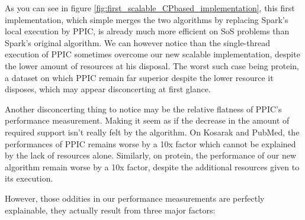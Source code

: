 \documentclass{eplmastersthesis}
\begin{document}
As you can see in figure \ref{fig:first_scalable_CPbased_implementation}, this first implementation, which simple merges the two algorithms by replacing Spark's local execution by PPIC, is already much more efficient on \acrlong{SoS} problems than Spark's original algorithm. We can however notice than the single-thread execution of PPIC sometimes overcome our new scalable implementation, despite the lower amount of resources at his disposal. The worst such case being protein, a dataset on which PPIC remain far superior despite the lower resource it disposes, which may appear disconcerting at first glance. \newline

Another disconcerting thing to notice may be the relative flatness of PPIC's performance measurement. Making it seem as if the decrease in the amount of required support isn't really felt by the algorithm. On Kosarak and PubMed, the performances of PPIC remains worse by a 10x factor which cannot be explained by the lack of resources alone. Similarly, on protein, the performance of our new algorithm remain worse by a 10x factor, despite the additional resources given to its execution. \newline

However, those oddities in our performance measurements are perfectly explainable, they actually result from three major factors:
\end{document}
